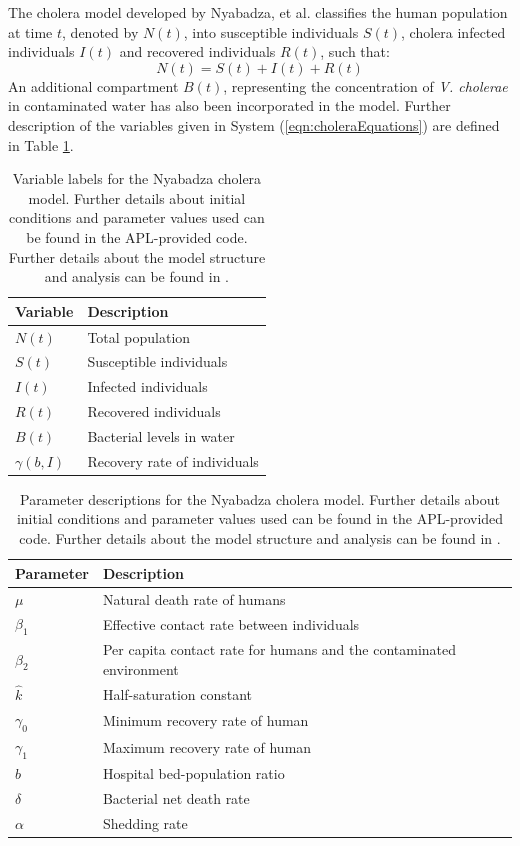 \documentclass[letter,12pt, usenames,dvipsnames]{article}
\begin{document}
The cholera model developed by Nyabadza, et al. classifies the human population at
time $t$, denoted by $N(t)$, into susceptible individuals $S(t)$,
cholera infected individuals $I(t)$ and recovered individuals $R(t)$, such that: $$N(t) = S(t) + I(t) + R(t)$$ 
An additional compartment $B(t)$, representing the concentration of \textit{V. cholerae} in contaminated water has also been  incorporated in the model. Further description of the variables given in System (\ref{eqn:choleraEquations}) are defined in Table \ref{table:CholeraVariables}.

\begin{table}[h!]
\centering
\begin{tabular}{|l|l|}
\hline
Variable & Description \\\hline\hline 
$N(t)$ & Total population\\\hline
$S(t)$ & Susceptible individuals \\\hline
$I(t)$ & Infected individuals \\\hline
$R(t)$ & Recovered individuals\\\hline
$B(t)$ & Bacterial levels in water\\\hline
$\gamma (b, I)$ & Recovery rate of individuals\\\hline
\end{tabular}
\caption{Variable labels for the Nyabadza cholera model.  Further details about initial conditions and parameter values used can be found in the APL-provided code.  Further details about the model structure and analysis can be found in \cite{cholera}.}
\label{table:CholeraVariables}
\end{table}

\begin{table}[h!]
\centering
\begin{tabular}{|l|l|}
\hline
Parameter & Description \\\hline\hline 
$\mu$ & Natural death rate of humans\\\hline
$\beta_1$ & Effective contact rate between individuals \\\hline
$\beta_2$ & Per capita contact rate for humans and the
contaminated environment\\\hline
$\hat{k}$ & Half-saturation constant\\\hline
$\gamma_0$ & Minimum recovery rate of human\\\hline
$\gamma_1$ & Maximum recovery rate of human\\\hline
$\hat{b}$ & Hospital bed-population ratio\\\hline
$\delta$ & Bacterial net death rate\\\hline
$\alpha$ & Shedding rate\\\hline
\end{tabular}
\caption{Parameter descriptions for the Nyabadza cholera model.  Further details about initial conditions and parameter values used can be found in the APL-provided code.  Further details about the model structure and analysis can be found in \cite{cholera}.}
\label{table:CholeraParameters}
\end{table}
\end{document}
